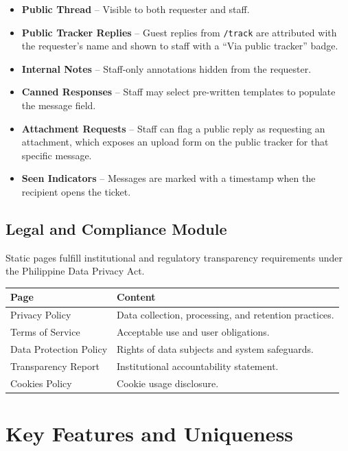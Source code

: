 \documentclass[12pt,a4paper]{article}
\newcommand{\code}[1]{\texttt{#1}}
\begin{document}
\begin{itemize}
    \item \textbf{Public Thread} -- Visible to both requester and staff.
    \item \textbf{Public Tracker Replies} -- Guest replies from \code{/track} are attributed with the requester's name and shown to staff with a ``Via public tracker'' badge.
    \item \textbf{Internal Notes} -- Staff-only annotations hidden from the requester.
    \item \textbf{Canned Responses} -- Staff may select pre-written templates to populate the message field.
    \item \textbf{Attachment Requests} -- Staff can flag a public reply as requesting an attachment, which exposes an upload form on the public tracker for that specific message.
    \item \textbf{Seen Indicators} -- Messages are marked with a timestamp when the recipient opens the ticket.
\end{itemize}

\subsection{Legal and Compliance Module}

Static pages fulfill institutional and regulatory transparency requirements under the Philippine Data Privacy Act.

\begin{table}[h]
\centering
\begin{tabularx}{\textwidth}{@{} l Y @{}}
\toprule
\textbf{Page} & \textbf{Content} \\
\midrule
Privacy Policy & Data collection, processing, and retention practices. \\
Terms of Service & Acceptable use and user obligations. \\
Data Protection Policy & Rights of data subjects and system safeguards. \\
Transparency Report & Institutional accountability statement. \\
Cookies Policy & Cookie usage disclosure. \\
\bottomrule
\end{tabularx}
\end{table}

\section{Key Features and Uniqueness}
\end{document}
